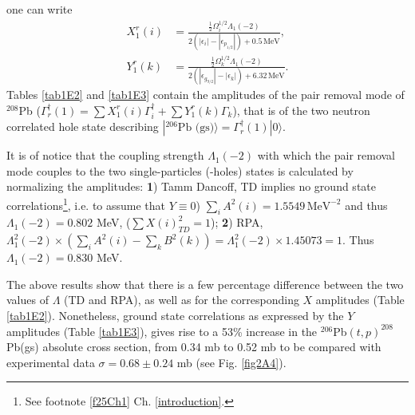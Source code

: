one can write
\begin{align}\label{eq3.5.6}
X_1^r(i)&=\frac{\frac{1}{2}\Omega_i^{1/2}\Lambda_1(-2)}{2(|\epsilon_i|-|\epsilon_{p_{1/2}}|)+0.5\,\text{MeV}},\\ Y_1^r(k)&=\frac{\frac{1}{2}\Omega_k^{1/2}\Lambda_1(-2)}{2(|\epsilon_{g_{9/2}}|-|\epsilon_k|)+6.32\,\text{MeV}}.\label{eq3.5.7}
\end{align}
Tables \ref{tab1E2} and \ref{tab1E3} contain the amplitudes of the pair removal mode of $^{208}$Pb ($\Gamma^\dagger_r(1)=\sum X^r_{1}(i)\Gamma^\dagger_i+\sum Y^r_{1}(k)\Gamma_k$), that is of the two neutron  correlated hole state describing $|^{206}\text{Pb (gs)}\rangle=\Gamma^\dagger_r(1)|0\rangle$. 


It is of notice that the coupling strength $\Lambda_1 (-2)$ with which the pair removal mode couples to the two single-particles (-holes) states is calculated by normalizing the amplitudes: \textbf{1}) Tamm Dancoff, TD implies no ground state correlations\footnote{See footnote \ref{f25Ch1} Ch. \ref{introduction}.}, i.e. to assume that $Y\equiv0$) $\sum_iA^2(i)=1.5549 \,\text{MeV}^{-2}$ and thus $\Lambda_1 (-2)=0.802$ MeV, ($\sum X(i)^2_{TD}=1$); \textbf{2}) RPA, $\Lambda_1^2 (-2)\times(\sum_i A^2(i)-\sum_k B^2(k))=\Lambda_1^2(-2)\times1.45073=1$. Thus $\Lambda_1(-2)=0.830$ MeV.


 The above results show that there is a few percentage difference between the two values of $\Lambda$ (TD and RPA), as well as for the corresponding $X$ amplitudes (Table \ref{tab1E2}). Nonetheless, ground state correlations as expressed by the $Y$ amplitudes (Table \ref{tab1E3}), gives rise to a 53\% increase in the $^{206}$Pb$(t,p)^{208}$Pb(gs) absolute cross section, from 0.34 mb to 0.52 mb to be compared with experimental data $\sigma=0.68\pm 0.24$ mb (see Fig. \ref{fig2A4}).



